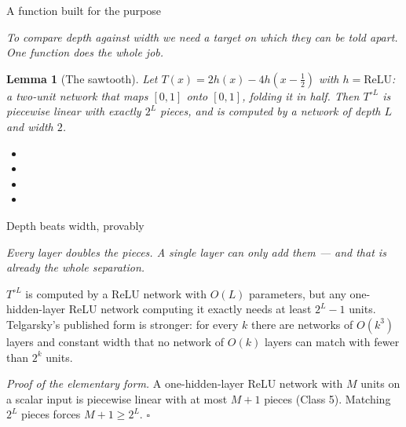\documentclass[aspectratio=169, 11pt]{beamer}
\newtheorem{lemmax}[theorem]{Lemma}
\newcommand{\bridge}[1]{%
  {\scriptsize\itshape\color{mcMuted} #1\par}\vspace{0.35em}}
\begin{document}
\begin{frame}{A function built for the purpose}
  \bridge{To compare depth against width we need a target on which they
  can be told apart. One function does the whole job.}
  \vspace{0.3em}
  \begin{lemmax}[The sawtooth]
    {\small Let $T(x)=2h(x)-4h(x-\tfrac12)$ with $h=\mathrm{ReLU}$: a
    \alert{two-unit} network that maps $[0,1]$ onto $[0,1]$, folding it
    in half. Then $T^{\circ L}$ is piecewise linear with exactly
    $2^{L}$ pieces, and is computed by a network of depth $L$ and
    width $2$.}
  \end{lemmax}
  \vspace{0.2em}
  {\footnotesize
  \begin{itemize}\setlength{\itemsep}{1pt}
    \item {}
    \item {}
    \item {}
    \item {}
  \end{itemize}}
\end{frame}

\begin{frame}{Depth beats width, provably}
  \bridge{Every layer doubles the pieces. A single layer can only add
  them --- and that is already the whole separation.}
  \vspace{0.3em}
  \begin{theorem}
    {\small $T^{\circ L}$ is computed by a ReLU network with $O(L)$
    parameters, but any \alert{one-hidden-layer} ReLU network computing
    it exactly needs at least $2^{L}-1$ units. Telgarsky's published
    form is stronger: for every $k$ there are networks of $O(k^{3})$
    layers and constant width that no network of $O(k)$ layers can match
    with fewer than $2^{k}$ units.}
  \end{theorem}
  \vspace{0.3em}
  {\small
  \emph{Proof of the elementary form.} A one-hidden-layer ReLU network
  with $M$ units on a scalar input is piecewise linear with at most
  $M+1$ pieces (Class 5). Matching $2^{L}$ pieces forces
  $M+1\geq 2^{L}$. \hfill$\square$}
\end{frame}
\end{document}
